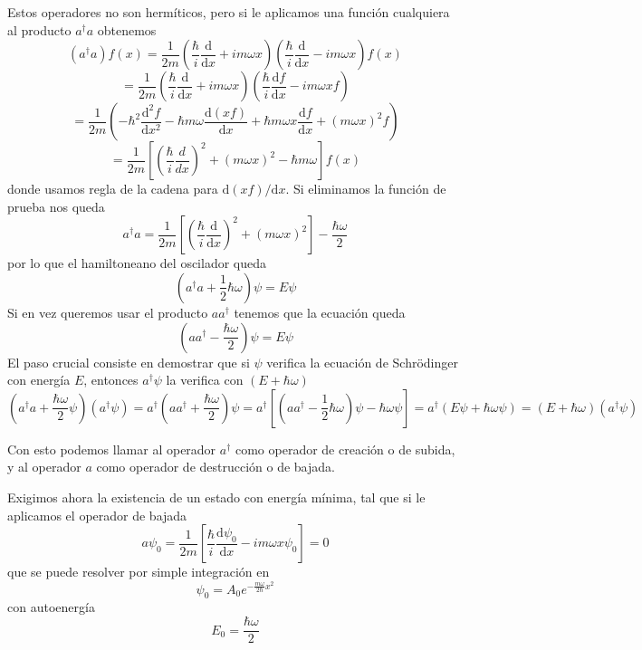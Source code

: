 \documentclass{book}
\numberwithin{equation}{section} %
\begin{document}
Estos operadores no son hermíticos, pero si le aplicamos una función cualquiera al producto $a^{\dagger}a$ obtenemos
\[ (a^{\dagger}a) f(x) =  \frac{1}{2m} \left(\frac{\hbar}{i} \frac{\mathrm{d}}{\mathrm{d}x} + i m \omega x\right) \left(\frac{\hbar}{i} \frac{\mathrm{d}}{\mathrm{d}x} - i m \omega x\right) f(x)\]
\[ =  \frac{1}{2m} \left(\frac{\hbar}{i} \frac{\mathrm{d}}{\mathrm{d}x} + i m \omega x\right) \left(\frac{\hbar}{i} \frac{\mathrm{d} f}{\mathrm{d}x} - i m \omega x f\right) \]
\[ =  \frac{1}{2m} \left(- \hbar^2 \frac{\mathrm{d}^2 f}{\mathrm{d}x^2} - \hbar m \omega \frac{\mathrm{d} (x f)}{\mathrm{d}x} + \hbar m  \omega x \frac{\mathrm{d}f}{\mathrm{d}x} + (m \omega x)^2 f\right) \]
\[ = \frac{1}{2m} \left[ \left(\frac{\hbar}{i} \frac{d}{dx}\right)^2 + (m \omega x)^2 - \hbar m \omega\right] f(x) \]
donde usamos regla de la cadena para $\mathrm{d}(x f)/\mathrm{d}x$.
Si eliminamos la función de prueba nos queda
\begin{equation}
    a^{\dagger} a = \frac{1}{2m} \left[\left(\frac{\hbar}{i} \frac{\mathrm{d}}{\mathrm{d}x}\right)^2 + (m \omega x)^2\right] - \frac{\hbar \omega}{2}
\end{equation}
por lo que el hamiltoneano del oscilador queda
\begin{equation}
    (a^{\dagger}a + \frac{1}{2}\hbar \omega) \psi = E \psi
\end{equation}
Si en vez queremos usar el producto $a a^\dagger$ tenemos que la ecuación queda
\begin{equation}
    \left(a a^{\dagger} - \frac{\hbar \omega}{2} \right)\psi = E \psi
\end{equation}
El paso crucial consiste en demostrar que si $\psi$ verifica la ecuación de Schrödinger con energía $E$, entonces $a^{\dagger} \psi$ la verifica con $(E + \hbar \omega)$
\[ (a^{\dagger} a + \frac{\hbar\omega}{2} \psi) (a^{\dagger} \psi) = a^{\dagger} (a a^{\dagger} + \frac{\hbar\omega}{2}) \psi = a^{\dagger} \left[\left(a a^\dagger - \frac{1}{2}\hbar \omega \right)\psi - \hbar \omega \psi \right] = a^{\dagger} (E \psi + \hbar\omega \psi) = (E + \hbar \omega)(a^{\dagger}\psi) \]

Con esto podemos llamar al operador $a^{\dagger}$ como operador de creación o de subida, y al operador $a$ como operador de destrucción o de bajada.

Exigimos ahora la existencia de un estado con energía mínima, tal que si le aplicamos el operador de bajada
\begin{equation}
    a \psi_0 = \frac{1}{2m} \left[\frac{\hbar}{i} \frac{\mathrm{d}\psi_0}{\mathrm{d}x} - i m \omega x \psi_0 \right] = 0
\end{equation}
que se puede resolver por simple integración en
\begin{equation}
    \psi_0 = A_0 e^{-\frac{m \omega}{2\hbar} x^2}
\end{equation}
con autoenergía
\begin{equation}
    E_0 = \frac{\hbar\omega}{2}
\end{equation}
\end{document}
